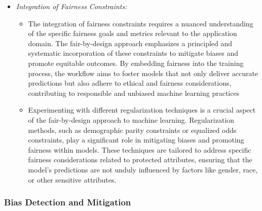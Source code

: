 \begin{itemize}

    \item \emph{Integration of Fairness Constraints:}

    \begin{itemize}

        \item The integration of fairness constraints requires a nuanced understanding of the specific fairness goals and metrics relevant to the application domain. The fair-by-design approach emphasizes a principled and systematic incorporation of these constraints to mitigate biases and promote equitable outcomes. By embedding fairness into the training process, the workflow aims to foster models that not only deliver accurate predictions but also adhere to ethical and fairness considerations, contributing to responsible and unbiased machine learning practices

        \item Experimenting with different regularization techniques is a crucial aspect of the fair-by-design approach to machine learning. Regularization methods, such as demographic parity constraints or equalized odds constraints, play a significant role in mitigating biases and promoting fairness within models. These techniques are tailored to address specific fairness considerations related to protected attributes, ensuring that the model's predictions are not unduly influenced by factors like gender, race, or other sensitive attributes.

    \end{itemize}

\end{itemize}

\subsubsection{Bias Detection and Mitigation}

